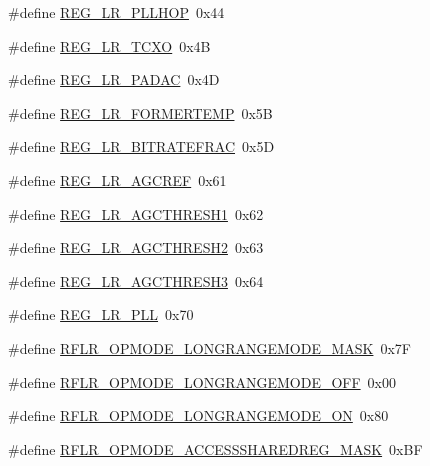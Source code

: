 \begin{DoxyCompactItemize}
\item 
\#define \mbox{\hyperlink{sx1276_regs-_lo_ra_8h_af71d93b5478ef3e6058e3787a1095503}{R\+E\+G\+\_\+\+L\+R\+\_\+\+P\+L\+L\+H\+OP}}~0x44
\item 
\#define \mbox{\hyperlink{sx1276_regs-_lo_ra_8h_ab7ec38544ea3e38b672c3c786607b3ea}{R\+E\+G\+\_\+\+L\+R\+\_\+\+T\+C\+XO}}~0x4B
\item 
\#define \mbox{\hyperlink{sx1276_regs-_lo_ra_8h_a0fe80f278fb8bf0702faad66404d4a5c}{R\+E\+G\+\_\+\+L\+R\+\_\+\+P\+A\+D\+AC}}~0x4D
\item 
\#define \mbox{\hyperlink{sx1276_regs-_lo_ra_8h_a8eedbc42b755b17b123d3ecdb8d785b8}{R\+E\+G\+\_\+\+L\+R\+\_\+\+F\+O\+R\+M\+E\+R\+T\+E\+MP}}~0x5B
\item 
\#define \mbox{\hyperlink{sx1276_regs-_lo_ra_8h_ab2660874b741525fc0424f8b0c59fb00}{R\+E\+G\+\_\+\+L\+R\+\_\+\+B\+I\+T\+R\+A\+T\+E\+F\+R\+AC}}~0x5D
\item 
\#define \mbox{\hyperlink{sx1276_regs-_lo_ra_8h_a3ad00cd303907ff68744172e6bf219c8}{R\+E\+G\+\_\+\+L\+R\+\_\+\+A\+G\+C\+R\+EF}}~0x61
\item 
\#define \mbox{\hyperlink{sx1276_regs-_lo_ra_8h_a5b15d639723d2681ebaa2d5f31286ce5}{R\+E\+G\+\_\+\+L\+R\+\_\+\+A\+G\+C\+T\+H\+R\+E\+S\+H1}}~0x62
\item 
\#define \mbox{\hyperlink{sx1276_regs-_lo_ra_8h_a58a2478774db4cf2ff4bdc89c7f29eff}{R\+E\+G\+\_\+\+L\+R\+\_\+\+A\+G\+C\+T\+H\+R\+E\+S\+H2}}~0x63
\item 
\#define \mbox{\hyperlink{sx1276_regs-_lo_ra_8h_a546cd6aa87137c48b5c98c5973f6f8de}{R\+E\+G\+\_\+\+L\+R\+\_\+\+A\+G\+C\+T\+H\+R\+E\+S\+H3}}~0x64
\item 
\#define \mbox{\hyperlink{sx1276_regs-_lo_ra_8h_a59ec52cf30ae082fee02bdf04a95dcf8}{R\+E\+G\+\_\+\+L\+R\+\_\+\+P\+LL}}~0x70
\item 
\#define \mbox{\hyperlink{sx1276_regs-_lo_ra_8h_a4f5c6acc1ecbded1e724e4d8d4614a4d}{R\+F\+L\+R\+\_\+\+O\+P\+M\+O\+D\+E\+\_\+\+L\+O\+N\+G\+R\+A\+N\+G\+E\+M\+O\+D\+E\+\_\+\+M\+A\+SK}}~0x7F
\item 
\#define \mbox{\hyperlink{sx1276_regs-_lo_ra_8h_abb6cc4dc044295367651d11fb77508bd}{R\+F\+L\+R\+\_\+\+O\+P\+M\+O\+D\+E\+\_\+\+L\+O\+N\+G\+R\+A\+N\+G\+E\+M\+O\+D\+E\+\_\+\+O\+FF}}~0x00
\item 
\#define \mbox{\hyperlink{sx1276_regs-_lo_ra_8h_a4d9b59767f3e421ed4b6a5857c1007bf}{R\+F\+L\+R\+\_\+\+O\+P\+M\+O\+D\+E\+\_\+\+L\+O\+N\+G\+R\+A\+N\+G\+E\+M\+O\+D\+E\+\_\+\+ON}}~0x80
\item 
\#define \mbox{\hyperlink{sx1276_regs-_lo_ra_8h_a01598cd825d7b0a773e420ba4811067c}{R\+F\+L\+R\+\_\+\+O\+P\+M\+O\+D\+E\+\_\+\+A\+C\+C\+E\+S\+S\+S\+H\+A\+R\+E\+D\+R\+E\+G\+\_\+\+M\+A\+SK}}~0x\+BF

\end{DoxyCompactItemize}
